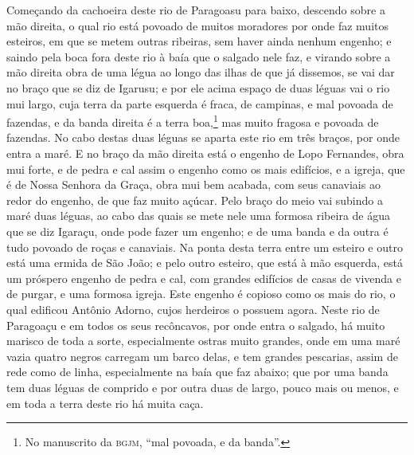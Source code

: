Começando da cachoeira deste rio de Paragoasu para baixo, descendo sobre a mão direita, o
qual rio está povoado de muitos moradores por onde faz muitos esteiros, em que se metem
outras ribeiras, sem haver ainda nenhum engenho; e saindo pela boca fora deste rio à baía
que o salgado nele faz, e virando sobre a mão direita obra de uma légua ao longo das ilhas
de que já dissemos, se vai dar no braço que se diz de Igarusu; e por ele acima espaço de
duas léguas vai o rio mui largo, cuja terra da parte esquerda é fraca, de campinas, e mal
povoada de fazendas, e da banda direita é a terra boa,\footnote{ No manuscrito da
\textsc{bgjm}, ``mal povoada, e da banda''.} mas muito fragosa e povoada de fazendas. No
cabo destas duas léguas se aparta este rio em três braços, por onde entra a maré. E no
braço da mão direita está o engenho de Lopo Fernandes, obra mui forte, e de pedra e cal
assim o engenho como os mais edifícios, e a igreja, que é de Nossa Senhora da Graça, obra
mui bem acabada, com seus canaviais ao redor do engenho, de que faz muito açúcar. Pelo
braço do meio vai subindo a maré duas léguas, ao cabo das quais se mete nele uma formosa
ribeira de água que se diz Igaraçu, onde pode fazer um engenho; e de uma banda e da outra
é tudo povoado de roças e canaviais. Na ponta desta terra entre um esteiro e outro está
uma ermida de São João; e pelo outro esteiro, que está à mão esquerda, está um próspero
engenho de pedra e cal, com grandes edifícios de casas de vivenda e de purgar, e uma
formosa igreja. Este engenho é copioso como os mais do rio, o qual edificou Antônio
Adorno, cujos herdeiros o possuem agora. Neste rio de Paragoaçu e em todos os seus
recôncavos, por onde entra o salgado, há muito marisco de toda a sorte, especialmente
ostras muito grandes, onde em uma maré vazia quatro negros carregam um barco delas, e tem
grandes pescarias, assim de rede como de linha, especialmente na baía que faz abaixo; que
por uma banda tem duas léguas de comprido e por outra duas de largo, pouco mais ou menos,
e em toda a terra deste rio há muita caça.

